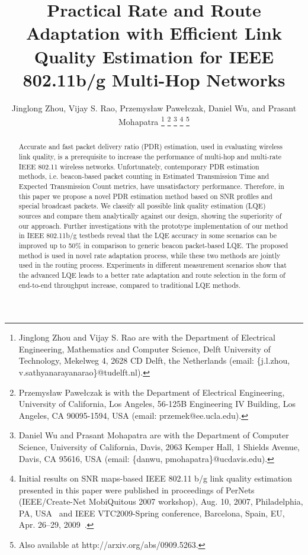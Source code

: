\documentclass[11pt,draftclsnofoot,journal,onecolumn]{IEEEtran}
\begin{document}
\title{Practical Rate and Route Adaptation with Efficient Link Quality Estimation for IEEE 802.11b/g Multi-Hop Networks}
\author{Jinglong {Zhou}, Vijay S. {Rao}, Przemys{\l}aw Pawe{\l}czak, Daniel {Wu}, and Prasant {Mohapatra}
\thanks{Jinglong {Zhou} and Vijay S. {Rao} are with the Department of Electrical Engineering, Mathematics and Computer Science, Delft University of Technology, Mekelweg 4, 2628 CD Delft, the Netherlands (email: \{j.l.zhou, v.sathyanarayanarao\}@tudelft.nl).}
\thanks{Przemys{\l}aw {Pawe{\l}czak} is with the Department of Electrical Engineering, University of California, Los Angeles, 56-125B Engineering IV Building, Los Angeles, CA 90095-1594, USA (email: przemek@ee.ucla.edu).}
\thanks{Daniel {Wu} and Prasant {Mohapatra} are with the Department of Computer Science, University of California, Davis, 2063 Kemper Hall, 1 Shields Avenue, Davis, CA 95616, USA (email: \{danwu, pmohapatra\}@ucdavis.edu).}
\thanks{Initial results on SNR maps-based IEEE 802.11 b/g link quality estimation presented in this paper were published in proceedings of PerNets (IEEE/Create-Net MobiQuitous 2007 workshop), Aug. 10, 2007, Philadelphia, PA, USA~\cite{Zhou_Pernets_2007} and IEEE VTC2009-Spring conference, Barcelona, Spain, EU, Apr. 26--29, 2009~\cite{Zhou_VTC_2009}.}
\thanks{Also available at http://arxiv.org/abs/0909.5263.}
}

\maketitle

\begin{abstract}
Accurate and fast packet delivery ratio (PDR) estimation, used in evaluating wireless link quality, is a prerequisite to increase the performance of multi-hop and multi-rate IEEE 802.11 wireless networks. Unfortunately, contemporary PDR estimation methods, i.e. beacon-based packet counting in Estimated Transmission Time and Expected Transmission Count metrics, have unsatisfactory performance. Therefore, in this paper we propose a novel PDR estimation method based on SNR profiles and special broadcast packets. We classify all possible link quality estimation (LQE) sources and compare them analytically against our design, showing the superiority of our approach. Further investigations with the prototype implementation of our method in IEEE 802.11b/g testbeds reveal that the LQE accuracy in some scenarios can be improved up to 50\% in comparison to generic beacon packet-based LQE. The proposed method is used in novel rate adaptation process, while these two methods are jointly used in the routing process. Experiments in different measurement scenarios show that the advanced LQE leads to a better rate adaptation and route selection in the form of end-to-end throughput increase, compared to traditional LQE methods.
\end{abstract}
\end{document}
